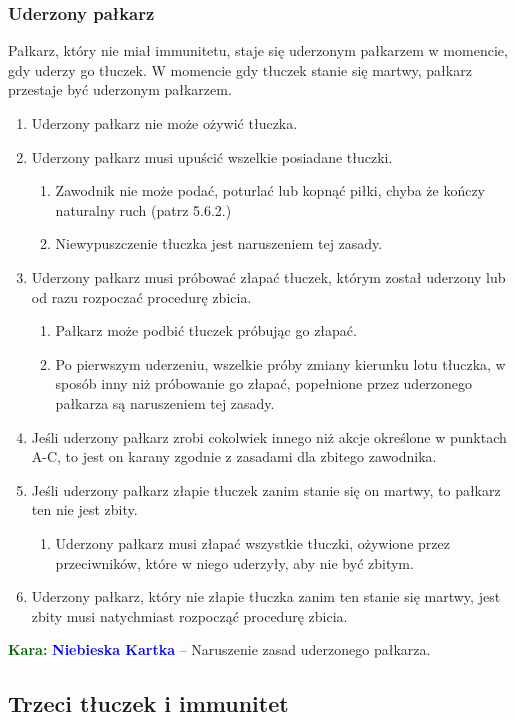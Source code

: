 \documentclass[11pt,a4paper]{article}
\newcommand\bluecard[1]{\bgroup\textcolor{darkgreen}{\textbf{Kara: }}\bgroup\textcolor{blue}{\textbf{Niebieska Kartka}} -- #1}
\begin{document}
\subsubsection{Uderzony pałkarz}
Pałkarz, który nie miał immunitetu, staje się uderzonym pałkarzem w momencie, gdy uderzy go tłuczek. W momencie gdy tłuczek stanie się martwy, pałkarz przestaje być uderzonym pałkarzem.
\begin{enumerate}
  \item Uderzony pałkarz nie może ożywić tłuczka.
  \item Uderzony pałkarz musi upuścić wszelkie posiadane tłuczki.
  \begin{enumerate}
    \item Zawodnik nie może podać, poturlać lub kopnąć piłki, chyba że kończy naturalny ruch (patrz 5.6.2.) %
    \item Niewypuszczenie tłuczka jest naruszeniem tej zasady.
  \end{enumerate}
  \item Uderzony pałkarz musi próbować złapać tłuczek, którym został uderzony lub od razu rozpoczać procedurę zbicia.
  \begin{enumerate}
    \item Pałkarz może podbić tłuczek próbując go złapać.
    \item Po pierwszym uderzeniu, wszelkie próby zmiany kierunku lotu tłuczka, w sposób inny niż próbowanie go złapać, popełnione przez uderzonego pałkarza są naruszeniem tej zasady.
  \end{enumerate}
  \item Jeśli uderzony pałkarz zrobi cokolwiek innego niż akcje określone w punktach A-C, to jest on karany zgodnie z zasadami dla zbitego zawodnika.
  \item Jeśli uderzony pałkarz złapie tłuczek zanim stanie się on martwy, to pałkarz ten nie jest zbity.
  \begin{enumerate}
    \item Uderzony pałkarz musi złapać wszystkie tłuczki, ożywione przez przeciwników, które w niego uderzyły, aby nie być zbitym.
  \end{enumerate}
  \item Uderzony pałkarz, który nie złapie tłuczka zanim ten stanie się martwy, jest zbity musi natychmiast rozpocząć procedurę zbicia.
\end{enumerate}

\bluecard{Naruszenie zasad uderzonego pałkarza.}

\subsection{Trzeci tłuczek i immunitet}
\end{document}
